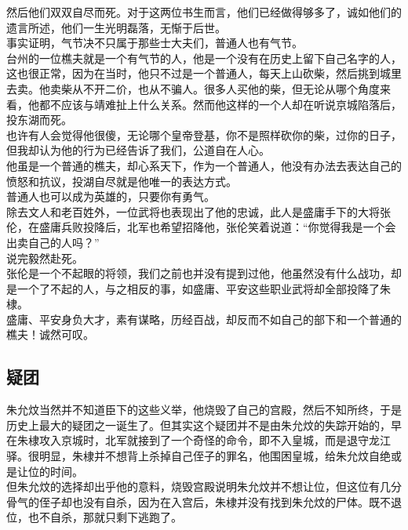 \begin{multicols}{\theparacolNo}
然后他们双双自尽而死。对于这两位书生而言，他们已经做得够多了，诚如他们的遗言所述，他们一生光明磊落，无惭于后世。\\

事实证明，气节决不只属于那些士大夫们，普通人也有气节。\\

台州的一位樵夫就是一个有气节的人，他是一个没有在历史上留下自己名字的人，这也很正常，因为在当时，他只不过是一个普通人，每天上山砍柴，然后挑到城里去卖。他卖柴从不开二价，也从不骗人。很多人买他的柴，但无论从哪个角度来看，他都不应该与靖难扯上什么关系。然而他这样的一个人却在听说京城陷落后，投东湖而死。\\

也许有人会觉得他很傻，无论哪个皇帝登基，你不是照样砍你的柴，过你的日子，但我却认为他的行为已经告诉了我们，公道自在人心。\\

他虽是一个普通的樵夫，却心系天下，作为一个普通人，他没有办法去表达自己的愤怒和抗议，投湖自尽就是他唯一的表达方式。\\

普通人也可以成为英雄的，只要你有勇气。\\

除去文人和老百姓外，一位武将也表现出了他的忠诚，此人是盛庸手下的大将张伦，在盛庸兵败投降后，北军也希望招降他，张伦笑着说道：“你觉得我是一个会出卖自己的人吗？”\\

说完毅然赴死。\\

张伦是一个不起眼的将领，我们之前也并没有提到过他，他虽然没有什么战功，却是一个了不起的人，与之相反的事，如盛庸、平安这些职业武将却全部投降了朱棣。\\

盛庸、平安身负大才，素有谋略，历经百战，却反而不如自己的部下和一个普通的樵夫！诚然可叹。\\

\subsection{疑团}
朱允炆当然并不知道臣下的这些义举，他烧毁了自己的宫殿，然后不知所终，于是历史上最大的疑团之一诞生了。但其实这个疑团并不是由朱允炆的失踪开始的，早在朱棣攻入京城时，北军就接到了一个奇怪的命令，即不入皇城，而是退守龙江驿。很明显，朱棣并不想背上杀掉自己侄子的罪名，他围困皇城，给朱允炆自绝或是让位的时间。\\

但朱允炆的选择却出乎他的意料，烧毁宫殿说明朱允炆并不想让位，但这位有几分骨气的侄子却也没有自杀，因为在入宫后，朱棣并没有找到朱允炆的尸体。既不退位，也不自杀，那就只剩下逃跑了。\\


\end{multicols}
